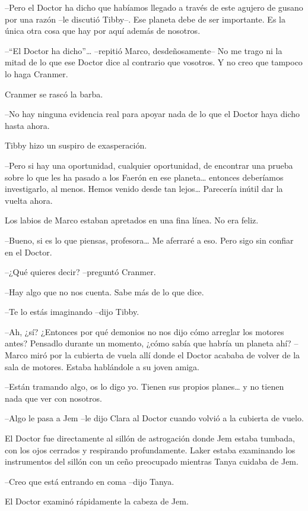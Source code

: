 {--Pero el Doctor ha dicho que habíamos llegado a través de este agujero
 de gusano por una razón --le discutió Tibby--. Ese planeta debe de ser
importante. Es la única otra cosa que hay por aquí además de nosotros.}

{--``El Doctor ha dicho''\ldots{} --repitió Marco, desdeñosamente-- No me
 trago ni la mitad de lo que ese Doctor dice al contrario que vosotros. Y
no creo que tampoco lo haga Cranmer.}

{Cranmer se rascó la barba.}

{--No hay ninguna evidencia real para apoyar nada de lo que el Doctor
haya dicho hasta ahora.}

{Tibby hizo un suspiro de exasperación.}

{--Pero si hay una oportunidad, cualquier oportunidad, de encontrar una
 prueba sobre lo que les ha pasado a los Faerón en ese planeta\ldots{}
 entonces deberíamos investigarlo, al menos. Hemos venido desde tan
 lejos\ldots{} Parecería inútil dar la vuelta ahora.}

{Los labios de Marco estaban apretados en una fina línea. No era feliz.}

{--Bueno, si es lo que piensas, profesora\ldots{} Me aferraré a eso. Pero
sigo sin confiar en el Doctor.}

{--¿Qué quieres decir? --preguntó Cranmer.}

{--Hay algo que no nos cuenta. Sabe más de lo que dice.}

{--Te lo estás imaginando --dijo Tibby.}

{--Ah, ¿sí? ¿Entonces por qué demonios no nos dijo cómo arreglar los
 motores antes? Pensadlo durante un momento, ¿cómo sabía que habría un
 planeta ahí? --Marco miró por la cubierta de vuela allí donde el Doctor
 acababa de volver de la sala de motores. Estaba hablándole a su joven
amiga.}

{--Están tramando algo, os lo digo yo. Tienen sus propios planes\ldots{}
 y no tienen nada que ver con nosotros.}

{--Algo le pasa a
Jem --le dijo Clara al Doctor cuando volvió a la cubierta de vuelo.}

{El Doctor fue directamente al sillón de astrogación donde Jem estaba
 tumbada, con los ojos cerrados y respirando profundamente. Laker estaba
 examinando los instrumentos del sillón con un ceño preocupado mientras
Tanya cuidaba de Jem.}

{--Creo que está entrando en coma --dijo Tanya.}

{El Doctor examinó rápidamente la cabeza de Jem.}

